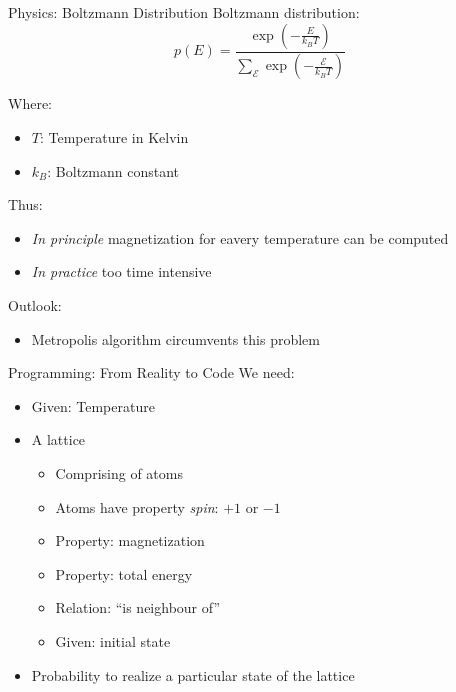 
\begin{frame}{Physics: Boltzmann Distribution}
%
Boltzmann distribution:
\[ p(E) = \frac
	{\exp( -\frac{E}{k_B T} )}
	{\sum_\mathcal{E} \exp( -\frac{\mathcal{E}}{k_B T} )}
\]

Where:
\begin{itemize}
\item $T$: Temperature in Kelvin
\item $k_B$: Boltzmann constant
\end{itemize}

Thus:
\begin{itemize}
\item \emph{In principle} magnetization for eavery temperature can be computed
\item \emph{In practice} too time intensive
\end{itemize}

Outlook:
\begin{itemize}
\item Metropolis algorithm circumvents this problem
\end{itemize}
%
\end{frame}


\begin{frame}{Programming: From Reality to Code}
%
We need:
\begin{itemize}
\item Given: Temperature
\item A lattice
	\begin{itemize}
	\item Comprising of atoms
	\item Atoms have property \emph{spin}: $+1$ or $-1$
	\item Property: magnetization
	\item Property: total energy
	\item Relation: \enquote{is neighbour of}
	\item Given: initial state
	\end{itemize}
\item Probability to realize a particular state of the lattice
\end{itemize}
%
\end{frame}


